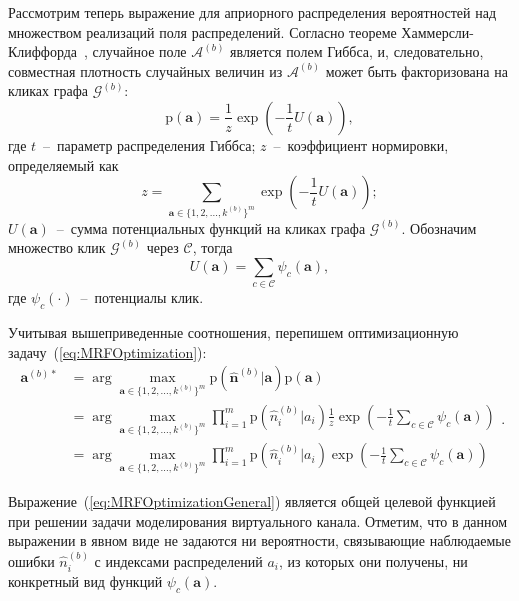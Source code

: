 Рассмотрим теперь выражение для априорного распределения вероятностей над множеством реализаций поля распределений. Согласно теореме Хаммерсли-Клиффорда~\cite{Li:2009:MRF:1529944}, случайное поле $\mathcal{A}^{(b)}$ является полем Гиббса, и, следовательно, совместная плотность случайных величин из $\mathcal{A}^{(b)}$ может быть факторизована на кликах графа $\mathcal{G}^{(b)}$:
\begin{equation}
\mathrm{p}(\mathbf{a}) = \frac{1}{z} \exp\left(-\frac{1}{t}U(\mathbf{a})\right),
\end{equation}
где $t$~--~параметр распределения Гиббса; $z$~--~коэффициент нормировки, определяемый как
\begin{equation}
z = \sum_{\mathbf{a} \in \{1,2,...,k^{(b)}\}^m} \exp\left(-\frac{1}{t}U(\mathbf{a})\right);
\end{equation}
$U(\mathbf{a})$~--~сумма потенциальных функций на кликах графа $\mathcal{G}^{(b)}$. Обозначим множество клик $\mathcal{G}^{(b)}$ через $\mathcal{C}$, тогда
\begin{equation}
U(\mathbf{a}) = \sum_{c \in \mathcal{C}} \psi_{c}(\mathbf{a}),
\end{equation}
где $\psi_{c}(\cdot)$~--~потенциалы клик.

Учитывая вышеприведенные соотношения, перепишем оптимизационную задачу~(\ref{eq:MRFOptimization}):
\begin{equation}
\begin{split}
\mathbf{a}^{(b)*} & = \arg\max_{\mathbf{a} \in \{1,2,\ldots,k^{(b)}\}^m} \mathrm{p}(\hat{\mathbf{n}}^{(b)} \vert \mathbf{a}) \mathrm{p}(\mathbf{a}) \\
& = \arg\max_{\mathbf{a} \in \{1,2,\ldots,k^{(b)}\}^m} \prod\limits_{i=1}^{m}\mathrm{p} (\hat{n}_i^{(b)} \vert a_i) \frac{1}{z} \exp\left(-\frac{1}{t}\sum_{c \in \mathcal{C}} \psi_{c}(\mathbf{a})\right) \\ 
& = \arg\max_{\mathbf{a} \in \{1,2,\ldots,k^{(b)}\}^m} \prod\limits_{i=1}^{m} \mathrm{p} (\hat{n}_i^{(b)} \vert a_i) \exp\left(-\frac{1}{t}\sum_{c \in \mathcal{C}} \psi_{c}(\mathbf{a})\right)
\end{split}.
\label{eq:MRFOptimizationGeneral}
\end{equation}

Выражение~(\ref{eq:MRFOptimizationGeneral}) является общей целевой функцией при решении задачи моделирования виртуального канала. Отметим, что в данном выражении в явном виде не задаются ни вероятности, связывающие наблюдаемые ошибки $\hat{n}_i^{(b)}$ с индексами распределений $a_i$, из которых они получены, ни конкретный вид функций $\psi_{c}(\mathbf{a})$.

